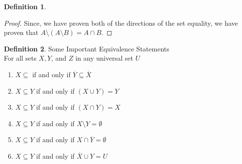 \documentclass{book}
\theoremstyle{definition}
\newtheorem{definition}{Definition}[section]
\theoremstyle{remark}
\begin{document}
\begin{definition}
\begin{proof}
            Since, we have proven both of the directions of the set equality, we have proven that $A \setminus (A \setminus B) = A \cap B$. 
        \end{proof}
\end{definition}

\newpage
\begin{definition}
Some Important Equivalence Statements \\

For all sets $X, Y$, and $Z$ in any universal set $U$ \\

    \begin{enumerate}
        \item $X \subseteq $ if and only if $\overline{Y} \subseteq \overline{X}$
        \item $X \subseteq Y $ if and only if $(X \cup Y) = Y$
        \item $X \subseteq Y $ if and only if $ (X \cap Y) = X$
        \item $X \subseteq Y $ if and only if $ X \setminus Y = \emptyset$
        \item $X \subseteq Y $ if and only if $ X \cap \overline{Y} = \emptyset$
        \item $X \subseteq Y $ if and only if $ \overline{X} \cup Y = U$
    \end{enumerate}
\end{definition}
\end{document}
